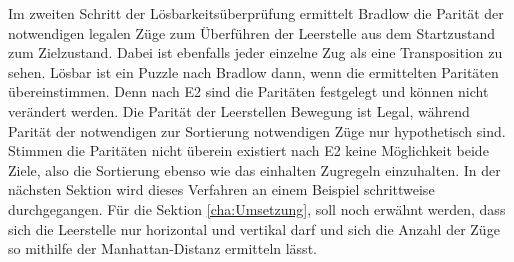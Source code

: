 Im zweiten Schritt der Lösbarkeitsüberprüfung ermittelt Bradlow die Parität der notwendigen legalen Züge zum Überführen der Leerstelle aus dem Startzustand zum Zielzustand. Dabei ist ebenfalls jeder einzelne Zug als eine Transposition zu sehen.\WNL%
Lösbar ist ein Puzzle nach Bradlow dann, wenn die ermittelten Paritäten übereinstimmen. Denn nach E2 sind die Paritäten festgelegt und können nicht verändert werden. Die Parität der Leerstellen Bewegung ist Legal, während Parität der notwendigen zur Sortierung notwendigen Züge nur hypothetisch sind. Stimmen die Paritäten nicht überein existiert nach E2 keine Möglichkeit beide Ziele, also die Sortierung ebenso wie das einhalten Zugregeln einzuhalten.
\WNL
In der nächsten Sektion wird dieses Verfahren an einem Beispiel schrittweise durchgegangen.
\WNL
Für die Sektion \ref*{cha:Umsetzung}, soll noch erwähnt werden, dass sich die Leerstelle nur horizontal und vertikal  darf und sich die Anzahl der Züge so mithilfe der Manhattan-Distanz ermitteln lässt.

